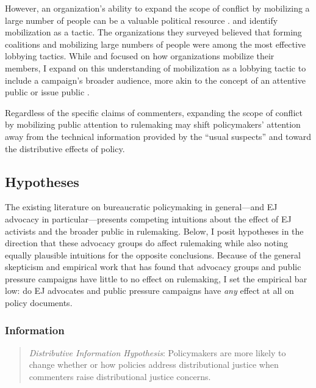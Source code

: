 \documentclass[
      12pt,
        ]{article}
\begin{document}
However, an organization's ability to expand the scope of conflict by mobilizing
a large number of people can be a valuable political resource \citep{Schattschneider1975}. \citet{Furlong1997} and \citet{Kerwin2011}
identify mobilization as a tactic. The organizations they surveyed
believed that forming coalitions and mobilizing large numbers of people
were among the most effective lobbying tactics. While \citet{Furlong1997} and \citet{Kerwin2011} focused on how
organizations mobilize their members, I expand on this understanding of mobilization as a lobbying tactic to include a campaign's broader audience, more akin to the concept of
an attentive public \citep{Key1961} or issue public \citep{Converse1964}.

Regardless of the specific claims of commenters, expanding the scope of conflict by mobilizing public attention to rulemaking may shift policymakers' attention away from the technical information provided by the ``usual suspects'' and toward the distributive effects of policy.

\hypertarget{hypotheses}{%
\subsection{Hypotheses}\label{hypotheses}}

The existing literature on bureaucratic policymaking in general---and EJ advocacy in particular---presents competing intuitions about the effect of EJ activists and the broader public in rulemaking. Below, I posit hypotheses in the direction that these advocacy groups do affect rulemaking while also noting equally plausible intuitions for the opposite conclusions. Because of the general skepticism and empirical work that has found that advocacy groups and public pressure campaigns have little to no effect on rulemaking, I set the empirical bar low: do EJ advocates and public pressure campaigns have \emph{any} effect at all on policy documents.

\hypertarget{information}{%
\subsubsection{Information}\label{information}}

\begin{quote}
\emph{Distributive Information Hypothesis}: Policymakers are more likely to change whether or how policies address distributional justice when commenters raise distributional justice concerns.
\end{quote}
\end{document}
